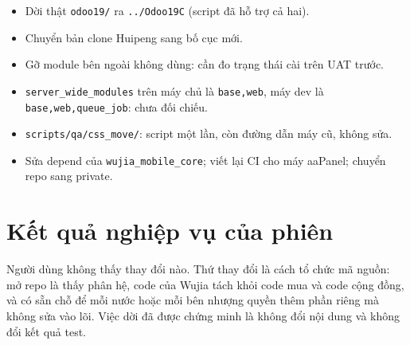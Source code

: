 \begin{itemize}[nosep]
\item Dời thật \texttt{odoo19/} ra \texttt{../Odoo19C} (script đã hỗ trợ cả hai).
\item Chuyển bản clone Huipeng sang bố cục mới.
\item Gỡ module bên ngoài không dùng: cần đo trạng thái cài trên UAT trước.
\item \texttt{server\_wide\_modules} trên máy chủ là \texttt{base,web}, máy dev là \texttt{base,web,queue\_job}:
  chưa đối chiếu.
\item \texttt{scripts/qa/css\_move/}: script một lần, còn đường dẫn máy cũ, không sửa.
\item Sửa depend của \texttt{wujia\_mobile\_core}; viết lại CI cho máy aaPanel; chuyển repo sang private.
\end{itemize}

\section{Kết quả nghiệp vụ của phiên}

Người dùng không thấy thay đổi nào. Thứ thay đổi là cách tổ chức mã nguồn: mở repo là thấy phân hệ, code của Wujia
tách khỏi code mua và code cộng đồng, và có sẵn chỗ để mỗi nước hoặc mỗi bên nhượng quyền thêm phần riêng mà không
sửa vào lõi. Việc dời đã được chứng minh là không đổi nội dung và không đổi kết quả test.
